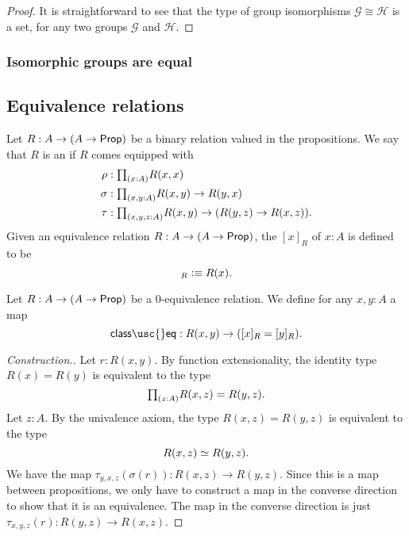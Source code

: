 \begin{proof}
It is straightforward to see that the type of group isomorphisms $\mathcal{G}\cong\mathcal{H}$ is a set, for any two groups $\mathcal{G}$ and $\mathcal{H}$.
\end{proof}

\subsubsection{Isomorphic groups are equal}

\subsection{Equivalence relations}

\begin{defn}\label{defn:eq_rel}
Let $R:A\to (A\to\mathsf{Prop})$ be a binary relation valued in the propositions. We say that $R$ is an  if $R$ comes equipped with
\begin{align*}
\rho & : \prd{x:A}R(x,x) \\
\sigma & : \prd{x,y:A} R(x,y)\to R(y,x) \\
\tau & : \prd{x,y,z:A} R(x,y)\to (R(y,z)\to R(x,z)).
\end{align*}
Given an equivalence relation $R:A\to (A\to\mathsf{Prop})$, the  $[x]_R$ of $x:A$ is defined to be
\begin{equation*}
[x]_R\defeq R(x).
\end{equation*}
\end{defn}

\begin{defn}
Let $R:A\to (A\to\mathsf{Prop})$ be a $0$-equivalence relation. 
We define for any $x,y:A$ a map
\begin{equation*}
\mathsf{class\usc{}eq}:R(x,y)\to ([x]_R=[y]_R).
\end{equation*}
\end{defn}

\begin{proof}[Construction.]
Let $r:R(x,y)$. By function extensionality, the identity type $R(x)=R(y)$ is equivalent to the type
\begin{equation*}
\prd{z:A}R(x,z)=R(y,z).
\end{equation*}
Let $z:A$. By the univalence axiom, the type $R(x,z)=R(y,z)$ is equivalent to the type
\begin{equation*}
\eqv{R(x,z)}{R(y,z)}.
\end{equation*}
We have the map $\tau_{y,x,z}(\sigma(r)):R(x,z)\to R(y,z)$. Since this is a map between propositions, we only have to construct a map in the converse direction to show that it is an equivalence. The map in the converse direction is just $\tau_{x,y,z}(r):R(y,z)\to R(x,z)$. 
\end{proof}

